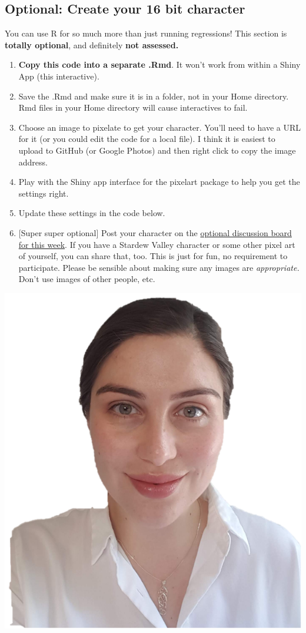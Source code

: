 \documentclass[
  openany]{book}
\providecommand{\tightlist}{%
  \setlength{\itemsep}{0pt}\setlength{\parskip}{0pt}}
\begin{document}
\hypertarget{optional-create-your-16-bit-character}{%
\subsection{Optional: Create your 16 bit character}\label{optional-create-your-16-bit-character}}

You can use R for so much more than just running regressions! This section is \textbf{totally optional}, and definitely \textbf{not assessed.}

\begin{enumerate}
\def\labelenumi{\arabic{enumi}.}
\tightlist
\item
  \textbf{Copy this code into a separate .Rmd}. It won't work from within a Shiny App (this interactive).\\
\item
  Save the .Rmd and make sure it is in a folder, not in your Home directory. Rmd files in your Home directory will cause interactives to fail.
\item
  Choose an image to pixelate to get your character. You'll need to have a URL for it (or you could edit the code for a local file). I think it is easiest to upload to GitHub (or Google Photos) and then right click to copy the image address.
\item
  Play with the Shiny app interface for the pixelart package to help you get the settings right.
\item
  Update these settings in the code below.
\item
  {[}Super super optional{]} Post your character on the \href{https://q.utoronto.ca/courses/253305/discussion_topics/1616645}{optional discussion board for this week}. If you have a Stardew Valley character or some other pixel art of yourself, you can share that, too. This is just for fun, no requirement to participate. Please be sensible about making sure any images are \emph{appropriate.} Don't use images of other people, etc.
\end{enumerate}

\begin{center}\includegraphics[width=0.25\linewidth]{images/m3/lb-for-statdew-valley} \end{center}
\end{document}

